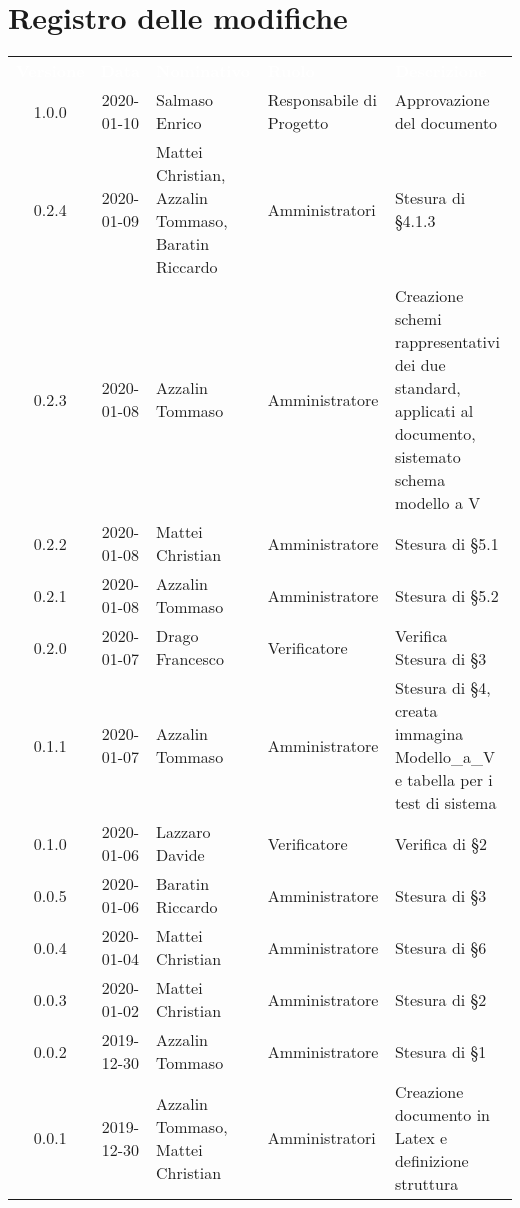 \section*{Registro delle modifiche}
{
\renewcommand{\arraystretch}{1.5}
\centering
\begin{longtable}{ c c  C{4cm}  C{3cm} C{4cm}}
\textcolor{white}{\textbf{Versione}} & \textcolor{white}{\textbf{Data}} & \textcolor{white}{\textbf{Nominativo}} & \textcolor{white}{\textbf{Ruolo}} & \textcolor{white}{\textbf{Descrizione}}\\	

1.0.0 & 2020-01-10 & Salmaso Enrico & Responsabile di Progetto & Approvazione del documento \\	

0.2.4 & 2020-01-09 & Mattei Christian, Azzalin Tommaso, Baratin Riccardo & Amministratori & Stesura di §4.1.3 \\
0.2.3 & 2020-01-08 & Azzalin Tommaso & Amministratore & Creazione schemi rappresentativi dei due standard, applicati al documento, sistemato schema modello a V \\
0.2.2 & 2020-01-08 & Mattei Christian & Amministratore & Stesura di §5.1 \\
0.2.1 & 2020-01-08 & Azzalin Tommaso & Amministratore & Stesura di §5.2 \\
0.2.0 & 2020-01-07 & Drago Francesco & Verificatore & Verifica Stesura di §3 \\
0.1.1 & 2020-01-07 & Azzalin Tommaso & Amministratore & Stesura di §4, creata immagina Modello\_a\_V e tabella per i test di sistema \\
0.1.0 & 2020-01-06 & Lazzaro Davide & Verificatore & Verifica di §2 \\
0.0.5 & 2020-01-06 & Baratin Riccardo & Amministratore & Stesura di §3 \\
0.0.4 & 2020-01-04 & Mattei Christian & Amministratore & Stesura di §6 \\
0.0.3 & 2020-01-02 & Mattei Christian & Amministratore & Stesura di §2 \\
0.0.2 & 2019-12-30 & Azzalin Tommaso & Amministratore & Stesura di §1 \\
0.0.1 & 2019-12-30 & Azzalin Tommaso, Mattei Christian & Amministratori & Creazione documento in Latex e definizione struttura \\	
		
\end{longtable}
}
